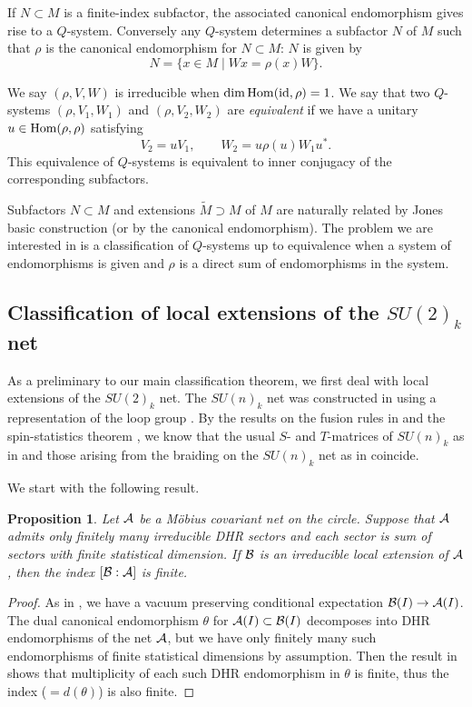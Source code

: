 \documentclass[12pt]{article}
\def\Hom{{\rm Hom}}
\def\id{{\rm id}}
\def\th{\theta}
\newtheorem{proposition}[theorem]{Proposition}
\def\N{{\cal A}}
\def\M{{\cal B}}
\begin{document}
If $N\subset M$ is a finite-index subfactor, the 
associated canonical endomorphism gives rise to a $Q$-system. 
Conversely any $Q$-system determines a subfactor $N$ of $M$ such that
$\rho$ is the canonical endomorphism for $N\subset M$: $N$ is given by
\[
N=\{x\in M\mid Wx=\rho(x)W\}.
\]

We say $(\rho, V, W)$ is irreducible when $\dim\Hom(\id,\rho)=1$.
We say that two $Q$-systems $(\rho, V_1, W_1)$ and $(\rho, V_2, W_2)$
are {\sl equivalent} if we have a unitary $u\in \Hom(\rho,\rho)$ satisfying
\[
V_2=u V_1,\qquad W_2=u\rho(u)W_1 u^*.
\]
This equivalence of $Q$-systems is equivalent to inner conjugacy of
the corresponding subfactors.

Subfactors $N\subset M$ and extensions $\tilde M\supset M$ of $M$ are 
naturally related by Jones basic construction (or by the canonical 
endomorphism).
The problem we are interested in is a classification of $Q$-systems
up to equivalence when a system of endomorphisms is given
and $\rho$ is a direct sum of endomorphisms in the system.

\subsection{Classification of local extensions of the $SU(2)_k$ net}

As a preliminary to our main classification theorem, we first
deal with local extensions of the $SU(2)_k$ net.
The $SU(n)_k$ net was constructed in \cite{W} using a representation
of the loop group \cite{PS}.  By the results on the fusion rules
in \cite{W} and the spin-statistics theorem \cite{GL2},
we know that the usual $S$- and $T$-matrices of $SU(n)_k$ as 
in \cite[Section 17.1.1]{DMS} and those arising from the braiding
on the $SU(n)_k$ net as in \cite{R1} coincide.

We start with the following result.

\begin{proposition}
\label{finite-index}
Let $\N$ be a M\"{o}bius covariant net on the circle. Suppose that
$\N$ admits only finitely many irreducible DHR sectors and each sector 
is sum of sectors with finite statistical dimension.  If
$\M$ is an irreducible local extension of $\N$, then 
the index $[\M:\N]$ is finite.
\end{proposition}

\begin{proof}
As in \cite[Lemma 13]{L4}, we have a vacuum preserving
conditional expectation $\M(I)\to \N(I)$.  The dual canonical endomorphism
$\th$ for $\N(I)\subset \M(I)$ decomposes into DHR endomorphisms of the
net $\N$, but we have only finitely many such endomorphisms of
finite statistical dimensions by assumption.
Then the result in \cite[page 39]{ILP} shows that multiplicity of
each such DHR endomorphism in $\th$ is finite, thus the index 
($=d(\th)$) is also finite.
\end{proof}
\end{document}
